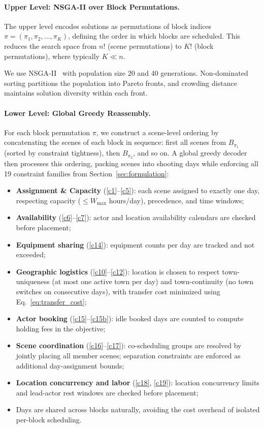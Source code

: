 \paragraph{Upper Level: NSGA-II over Block Permutations.}
The upper level encodes solutions as permutations of block indices $\pi = (\pi_1, \pi_2, \ldots, \pi_K)$, defining the order in which blocks are scheduled.
This reduces the search space from $n!$ (scene permutations) to $K!$ (block permutations), where typically $K \ll n$.

We use NSGA-II~\citep{deb2002} with population size 20 and 40 generations.
Non-dominated sorting partitions the population into Pareto fronts, and crowding distance maintains solution diversity within each front.

\paragraph{Lower Level: Global Greedy Reassembly.}
For each block permutation $\pi$, we construct a scene-level ordering by concatenating the scenes of each block in sequence: first all scenes from $B_{\pi_1}$ (sorted by constraint tightness), then $B_{\pi_2}$, and so on.
A global greedy decoder then processes this ordering, packing scenes into shooting days while enforcing all 19 constraint families from Section~\ref{sec:formulation}:
\begin{itemize}
    \item \textbf{Assignment \& Capacity} (\ref{c1}--\ref{c5}): each scene assigned to exactly one day, respecting capacity ($\leq W_{\max}$ hours/day), precedence, and time windows;
    \item \textbf{Availability} (\ref{c6}--\ref{c7}): actor and location availability calendars are checked before placement;
    \item \textbf{Equipment sharing} (\ref{c14}): equipment counts per day are tracked and not exceeded;
    \item \textbf{Geographic logistics} (\ref{c10}--\ref{c12}): location is chosen to respect town-uniqueness (at most one active town per day) and town-continuity (no town switches on consecutive days), with transfer cost minimized using Eq.~\eqref{eq:transfer_cost};
    \item \textbf{Actor booking} (\ref{c15}--\ref{c15b}): idle booked days are counted to compute holding fees in the objective;
    \item \textbf{Scene coordination} (\ref{c16}--\ref{c17}): co-scheduling groups are resolved by jointly placing all member scenes; separation constraints are enforced as additional day-assignment bounds;
    \item \textbf{Location concurrency and labor} (\ref{c18}, \ref{c19}): location concurrency limits and lead-actor rest windows are checked before placement;
    \item Days are shared across blocks naturally, avoiding the cost overhead of isolated per-block scheduling.
\end{itemize}

